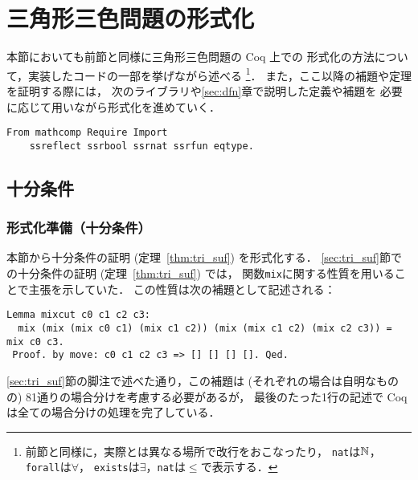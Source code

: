 \section{三角形三色問題の形式化}
本節においても前節と同様に三角形三色問題の Coq 上での
形式化の方法について，実装したコードの一部を挙げながら述べる
\footnote
    {
      前節と同様に，実際とは異なる場所で改行をおこなったり，
      {\tt{nat}}は$\mathbb{N}$，{\tt{forall}}は$\forall$，
      {\tt{exists}}は$\exists$，{\tt{nat}}は$\leq$で表示する．
    }．
また，ここ以降の補題や定理を証明する際には，
次のライブラリや\ref{sec:dfn}章で説明した定義や補題を
必要に応じて用いながら形式化を進めていく．
\begin{lstlisting}[language=Coq]
  From mathcomp Require Import
    ssreflect ssrbool ssrnat ssrfun eqtype.
\end{lstlisting}
  
\subsection{十分条件} \label{sec_suf_coq}
\subsubsection{形式化準備（十分条件）}
本節から十分条件の証明 (定理~\ref{thm:tri_suf}) を形式化する．
\ref{sec:tri_suf}節での十分条件の証明 (定理~\ref{thm:tri_suf}) では，
関数{\tt mix}に関する性質を用いることで主張を示していた．
この性質は次の補題として記述される：
\begin{lstlisting}[language=Coq]
 Lemma mixcut c0 c1 c2 c3:
  mix (mix (mix c0 c1) (mix c1 c2)) (mix (mix c1 c2) (mix c2 c3)) = mix c0 c3.
 Proof. by move: c0 c1 c2 c3 => [] [] [] []. Qed.
\end{lstlisting}
\ref{sec:tri_suf}節の脚注で述べた通り，この補題は (それぞれの場合は自明なものの) 81通りの場合分けを考慮する必要があるが，
最後のたった1行の記述で Coq は全ての場合分けの処理を完了している．

